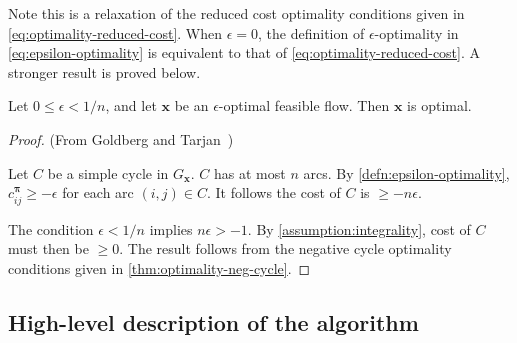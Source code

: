 \begin{remark}
Note this is a relaxation of the reduced cost optimality conditions given in \cref{eq:optimality-reduced-cost}. When $\epsilon = 0$, the definition of $\epsilon$-optimality in \cref{eq:epsilon-optimality} is equivalent to that of \cref{eq:optimality-reduced-cost}. A stronger result is proved below.\\
\end{remark}

\begin{thm} \label{thm:epsilon-optimality-optimal}
Let $0 \leq \epsilon < 1/n$, and let $\mathbf{x}$ be an $\epsilon$-optimal feasible flow. Then $\mathbf{x}$ is optimal.
\end{thm}
\begin{proof} (From Goldberg and Tarjan~\cite[theorem~3.4]{Goldberg:1987})
    
Let $C$ be a simple cycle in $G_\mathbf{x}$. $C$ has at most $n$ arcs. By \cref{defn:epsilon-optimality}, $c^{\boldsymbol{\pi}}_{ij} \geq -\epsilon$ for each arc $(i,j) \in C$. It follows the cost of $C$ is $\geq -n\epsilon$.

The condition $\epsilon < 1/n$ implies $n\epsilon > -1$. By \cref{assumption:integrality}, cost of $C$ must then be $\geq 0$. The result follows from the negative cycle optimality conditions given in \cref{thm:optimality-neg-cycle}.
\end{proof}

\subsection{High-level description of the algorithm}




